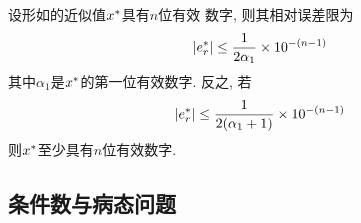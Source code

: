 \medskip

\begin{relative_error_limit_with_numbers_of_significant_digits}
    \label{theorem:relative_error_limit_with_numbers_of_significant_digits}
    设形如的近似值$x^\ast$具有$n$位有效%
    数字, 则其相对误差限为
    \begin{equation}
        |e^\ast_r|\le{1\over2\alpha_1}\times 10^{-(n-1)}
    \end{equation}
    其中$\alpha_1$是$x^\ast$的第一位有效数字. 反之, 若
    \begin{equation}
        |e^\ast_r|\le{1\over2(\alpha_1+1)}\times 10^{-(n-1)}
    \end{equation}
    则$x^\ast$至少具有$n$位有效数字.
\end{relative_error_limit_with_numbers_of_significant_digits}

\subsection{条件数与病态问题}
